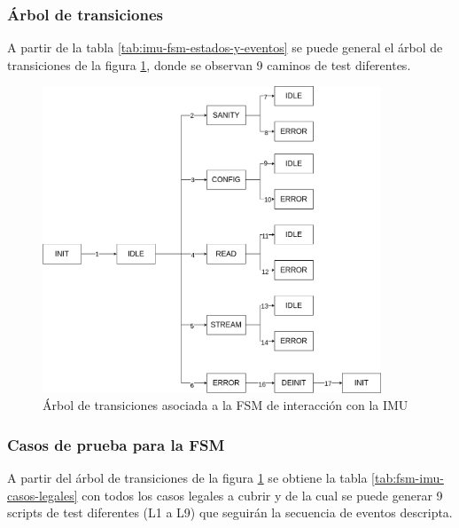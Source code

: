 \documentclass[
11pt, %
codirector, %
]{simple_charter}
\begin{document}
\subsubsection{Árbol de transiciones}
\label{sssec:arbol-de-transiciones}

A partir de la tabla \ref{tab:imu-fsm-estados-y-eventos} se puede general el árbol de transiciones
de la figura \ref{fig:arbol-de-transiciones}, donde se observan 9 caminos de test diferentes.

\begin{figure}[ht]
\centering
\includegraphics[width=0.9\textwidth]{imgs/imu_bridge_fsm-transition_tree.png}
\caption{Árbol de transiciones asociada a la FSM de interacción con la IMU}
\label{fig:arbol-de-transiciones}
\end{figure}

\subsubsection{Casos de prueba para la FSM}
\label{sssec:casos-de-prueba-para-la-fsm}

A partir del árbol de transiciones de la figura \ref{fig:arbol-de-transiciones} se obtiene la
tabla \ref{tab:fsm-imu-casos-legales} con todos los casos legales a cubrir y de la cual se puede
generar 9 scripts de test diferentes (L1 a L9) que seguirán la secuencia de eventos descripta.
\end{document}
